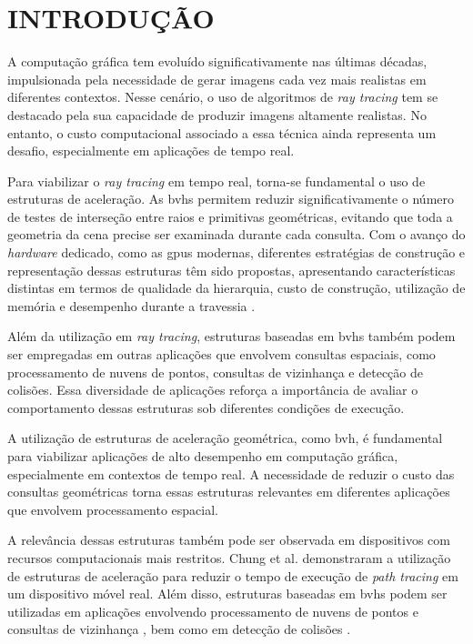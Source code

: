 \chapter{INTRODUÇÃO}

A computação gráfica tem evoluído significativamente nas últimas décadas, impulsionada pela necessidade de gerar imagens cada vez mais realistas em diferentes contextos. Nesse cenário, o uso de algoritmos de \textit{ray tracing} tem se destacado pela sua capacidade de produzir imagens altamente realistas. No entanto, o custo computacional associado a essa técnica ainda representa um desafio, especialmente em aplicações de tempo real.

Para viabilizar o \textit{ray tracing} em tempo real, torna-se fundamental o uso de estruturas de aceleração. As \glspl{bvh} permitem reduzir significativamente o número de testes de interseção entre raios e primitivas geométricas, evitando que toda a geometria da cena precise ser examinada durante cada consulta. Com o avanço do \textit{hardware} dedicado, como as \glspl{gpu} modernas, diferentes estratégias de construção e representação dessas estruturas têm sido propostas, apresentando características distintas em termos de qualidade da hierarquia, custo de construção, utilização de memória e desempenho durante a travessia \cite{meister2022performance}.

Além da utilização em \textit{ray tracing}, estruturas baseadas em \glspl{bvh} também podem ser empregadas em outras aplicações que envolvem consultas espaciais, como processamento de nuvens de pontos, consultas de vizinhança e detecção de colisões. Essa diversidade de aplicações reforça a importância de avaliar o comportamento dessas estruturas sob diferentes condições de execução.

A utilização de estruturas de aceleração geométrica, como \gls{bvh}, é fundamental para viabilizar aplicações de alto desempenho em computação gráfica, especialmente em contextos de tempo real. A necessidade de reduzir o custo das consultas geométricas torna essas estruturas relevantes em diferentes aplicações que envolvem processamento espacial.

A relevância dessas estruturas também pode ser observada em dispositivos com recursos computacionais mais restritos. Chung et al. \cite{chung2018comparison} demonstraram a utilização de estruturas de aceleração para reduzir o tempo de execução de \textit{path tracing} em um dispositivo móvel real. Além disso, estruturas baseadas em \glspl{bvh} podem ser utilizadas em aplicações envolvendo processamento de nuvens de pontos e consultas de vizinhança \cite{jakob2021optimizing}, bem como em detecção de colisões \cite{larsson2006dynamic}.

